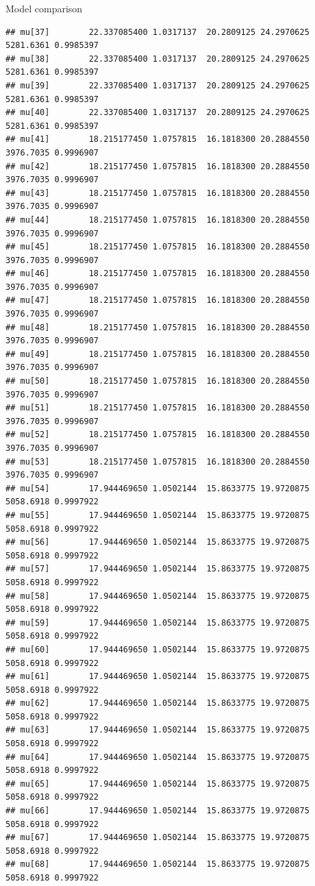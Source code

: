 \documentclass[
  ignorenonframetext,
]{beamer}
\begin{document}
\begin{frame}[fragile]{Model comparison}
\begin{verbatim}
## mu[37]        22.337085400 1.0317137  20.2809125 24.2970625 5281.6361 0.9985397
## mu[38]        22.337085400 1.0317137  20.2809125 24.2970625 5281.6361 0.9985397
## mu[39]        22.337085400 1.0317137  20.2809125 24.2970625 5281.6361 0.9985397
## mu[40]        22.337085400 1.0317137  20.2809125 24.2970625 5281.6361 0.9985397
## mu[41]        18.215177450 1.0757815  16.1818300 20.2884550 3976.7035 0.9996907
## mu[42]        18.215177450 1.0757815  16.1818300 20.2884550 3976.7035 0.9996907
## mu[43]        18.215177450 1.0757815  16.1818300 20.2884550 3976.7035 0.9996907
## mu[44]        18.215177450 1.0757815  16.1818300 20.2884550 3976.7035 0.9996907
## mu[45]        18.215177450 1.0757815  16.1818300 20.2884550 3976.7035 0.9996907
## mu[46]        18.215177450 1.0757815  16.1818300 20.2884550 3976.7035 0.9996907
## mu[47]        18.215177450 1.0757815  16.1818300 20.2884550 3976.7035 0.9996907
## mu[48]        18.215177450 1.0757815  16.1818300 20.2884550 3976.7035 0.9996907
## mu[49]        18.215177450 1.0757815  16.1818300 20.2884550 3976.7035 0.9996907
## mu[50]        18.215177450 1.0757815  16.1818300 20.2884550 3976.7035 0.9996907
## mu[51]        18.215177450 1.0757815  16.1818300 20.2884550 3976.7035 0.9996907
## mu[52]        18.215177450 1.0757815  16.1818300 20.2884550 3976.7035 0.9996907
## mu[53]        18.215177450 1.0757815  16.1818300 20.2884550 3976.7035 0.9996907
## mu[54]        17.944469650 1.0502144  15.8633775 19.9720875 5058.6918 0.9997922
## mu[55]        17.944469650 1.0502144  15.8633775 19.9720875 5058.6918 0.9997922
## mu[56]        17.944469650 1.0502144  15.8633775 19.9720875 5058.6918 0.9997922
## mu[57]        17.944469650 1.0502144  15.8633775 19.9720875 5058.6918 0.9997922
## mu[58]        17.944469650 1.0502144  15.8633775 19.9720875 5058.6918 0.9997922
## mu[59]        17.944469650 1.0502144  15.8633775 19.9720875 5058.6918 0.9997922
## mu[60]        17.944469650 1.0502144  15.8633775 19.9720875 5058.6918 0.9997922
## mu[61]        17.944469650 1.0502144  15.8633775 19.9720875 5058.6918 0.9997922
## mu[62]        17.944469650 1.0502144  15.8633775 19.9720875 5058.6918 0.9997922
## mu[63]        17.944469650 1.0502144  15.8633775 19.9720875 5058.6918 0.9997922
## mu[64]        17.944469650 1.0502144  15.8633775 19.9720875 5058.6918 0.9997922
## mu[65]        17.944469650 1.0502144  15.8633775 19.9720875 5058.6918 0.9997922
## mu[66]        17.944469650 1.0502144  15.8633775 19.9720875 5058.6918 0.9997922
## mu[67]        17.944469650 1.0502144  15.8633775 19.9720875 5058.6918 0.9997922
## mu[68]        17.944469650 1.0502144  15.8633775 19.9720875 5058.6918 0.9997922

\end{verbatim}
\end{frame}
\end{document}
